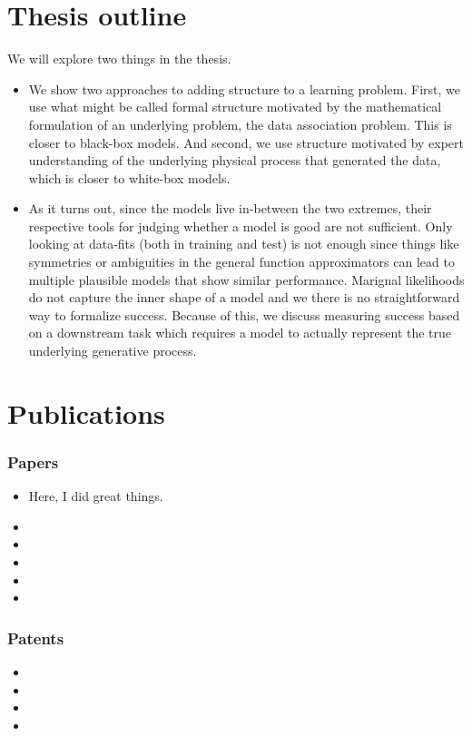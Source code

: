 \section{Thesis outline}
We will explore two things in the thesis.
\begin{itemize}
    \item We show two approaches to adding structure to a learning problem.
          First, we use what might be called formal structure motivated by the mathematical formulation of an underlying problem, the data association problem.
          This is closer to black-box models.
          And second, we use structure motivated by expert understanding of the underlying physical process that generated the data, which is closer to white-box models.
    \item As it turns out, since the models live in-between the two extremes, their respective tools for judging whether a model is good are not sufficient.
          Only looking at data-fits (both in training and test) is not enough since things like symmetries or ambiguities in the general function approximators can lead to multiple plausible models that show similar performance.
          Marignal likelihoods do not capture the inner shape of a model and we there is no straightforward way to formalize success.
          Because of this, we discuss measuring success based on a downstream task which requires a model to actually represent the true underlying generative process.
\end{itemize}


\section{Publications}
\subsubsection{Papers}
\begin{itemize}
    \item {}

          Here, I did great things.
    \item {}
    \item {}
    \item {}
    \item {}
    \item {}
\end{itemize}

\subsubsection{Patents}
\begin{itemize}
    \item {}
    \item {}
    \item {}
    \item {}
\end{itemize}
